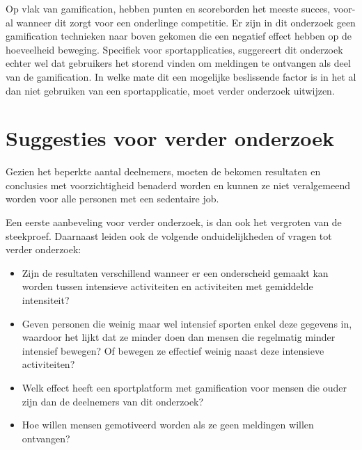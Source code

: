 Op vlak van gamification, hebben punten en scoreborden het meeste succes, voor-\linebreak al wanneer dit zorgt voor een onderlinge competitie. Er zijn in dit onderzoek geen gamification technieken naar boven gekomen die een negatief effect hebben op de hoeveelheid beweging. Specifiek voor sportapplicaties, suggereert dit onderzoek echter wel dat gebruikers het storend vinden om meldingen te ontvangen als deel van de gamification. In welke mate dit een mogelijke beslissende factor is in het al dan niet gebruiken van een sportapplicatie, moet verder onderzoek uitwijzen.

\section{Suggesties voor verder onderzoek}

Gezien het beperkte aantal deelnemers, moeten de bekomen resultaten en conclusies met voorzichtigheid benaderd worden en kunnen ze niet veralgemeend worden voor alle personen met een sedentaire job.

Een eerste aanbeveling voor verder onderzoek, is dan ook het vergroten van de steekproef. Daarnaast leiden ook de volgende onduidelijkheden of vragen tot verder onderzoek:

\begin{itemize}
    \item Zijn de resultaten verschillend wanneer er een onderscheid gemaakt kan worden tussen intensieve activiteiten en activiteiten met gemiddelde intensiteit?
    \item Geven personen die weinig maar wel intensief sporten enkel deze gegevens in, waardoor het lijkt dat ze minder doen dan mensen die regelmatig minder intensief bewegen? Of bewegen ze effectief weinig naast deze intensieve activiteiten?
    \item Welk effect heeft een sportplatform met gamification voor mensen die ouder zijn dan de deelnemers van dit onderzoek?
    \item Hoe willen mensen gemotiveerd worden als ze geen meldingen willen ontvangen?
\end{itemize}